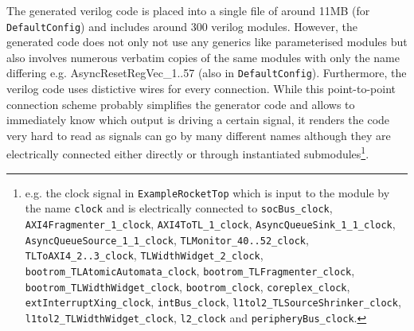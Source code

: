 \documentclass[journal,a4paper]{IEEEtran}
\begin{document}
The generated verilog code is placed into a single file of around 11MB (for \texttt{DefaultConfig}) and includes around 300 verilog modules.
However, the generated code does not only not use any generics like parameterised modules but also involves numerous verbatim copies of the same modules with only the name differing e.g. AsyncResetRegVec\_1..57 (also in \texttt{DefaultConfig}).
Furthermore, the verilog code uses distictive wires for every connection.
While this point-to-point connection scheme probably simplifies the generator code and allows to immediately know which output is driving a certain signal, it renders the code very hard to read as signals can go by many different names although they are electrically connected either directly or through instantiated submodules\footnote{e.g. the clock signal in \texttt{ExampleRocketTop} which is input to the module by the name \texttt{clock} and is electrically connected to \texttt{socBus\_clock}, \texttt{AXI4Fragmenter\_1\_clock}, \texttt{AXI4ToTL\_1\_clock}, \texttt{AsyncQueueSink\_1\_1\_clock}, \texttt{AsyncQueueSource\_1\_1\_clock}, \texttt{TLMonitor\_40..52\_clock}, \texttt{TLToAXI4\_2..3\_clock}, \texttt{TLWidthWidget\_2\_clock}, \texttt{bootrom\_TLAtomicAutomata\_clock}, \texttt{bootrom\_TLFragmenter\_clock}, \texttt{bootrom\_TLWidthWidget\_clock}, \texttt{bootrom\_clock}, \texttt{coreplex\_clock}, \texttt{extInterruptXing\_clock}, \texttt{intBus\_clock}, \texttt{l1tol2\_TLSourceShrinker\_clock}, \texttt{l1tol2\_TLWidthWidget\_clock}, \texttt{l2\_clock} and \texttt{peripheryBus\_clock}.}.



\end{document}
